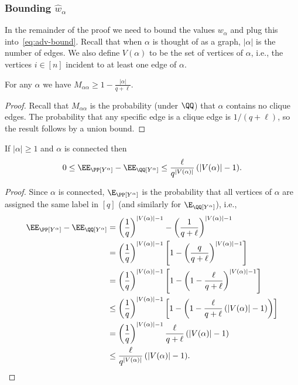 \documentclass{article}
\begin{document}
\subsubsection{Bounding $\hat{w}_\alpha$}

In the remainder of the proof we need to bound the values $w_\alpha$ and plug this into~\eqref{eq:adv-bound}. Recall that when $\alpha$ is thought of as a graph, $|\alpha|$ is the number of edges. We also define $V(\alpha)$ to be the set of vertices of $\alpha$, i.e., the vertices $i \in [n]$ incident to at least one edge of $\alpha$.

\begin{lemma}\label{lem:M-diag}
For any $\alpha$ we have $M_{\alpha\alpha} \ge 1 - \frac{|\alpha|}{q+\ell}$.
\end{lemma}

\begin{proof}
Recall that $M_{\alpha\alpha}$ is the probability (under $\QQ$) that $\alpha$ contains no clique edges. The probability that any specific edge is a clique edge is $1/(q+\ell)$, so the result follows by a union bound.
\end{proof}

\begin{lemma}\label{lem:moment-diff}
If $|\alpha| \ge 1$ and $\alpha$ is connected then
\[ 0 \le \EE_\PP[Y^\alpha] - \EE_\QQ[Y^\alpha] \le \frac{\ell}{q^{|V(\alpha)|}} \, (|V(\alpha)|-1). \]
\end{lemma}

\begin{proof}
Since $\alpha$ is connected, $\E_\PP[Y^\alpha]$ is the probability that all vertices of $\alpha$ are assigned the same label in $[q]$ (and similarly for $\E_\QQ[Y^\alpha]$), i.e.,
\begin{align*}
\EE_\PP[Y^\alpha] - \EE_\QQ[Y^\alpha] &= \left(\frac{1}{q}\right)^{|V(\alpha)|-1} - \left(\frac{1}{q+\ell}\right)^{|V(\alpha)|-1} \\
&= \left(\frac{1}{q}\right)^{|V(\alpha)|-1}\left[1 - \left(\frac{q}{q+\ell}\right)^{|V(\alpha)|-1}\right] \\
&= \left(\frac{1}{q}\right)^{|V(\alpha)|-1}\left[1 - \left(1 - \frac{\ell}{q+\ell}\right)^{|V(\alpha)|-1}\right] \\
&\le \left(\frac{1}{q}\right)^{|V(\alpha)|-1}\left[1 - \left(1 - \frac{\ell}{q+\ell} \, (|V(\alpha)|-1)\right)\right] \\
&= \left(\frac{1}{q}\right)^{|V(\alpha)|-1} \frac{\ell}{q+\ell} \, (|V(\alpha)|-1) \\
&\le \frac{\ell}{q^{|V(\alpha)|}} \, (|V(\alpha)|-1).
\end{align*}
\end{proof}
\end{document}
